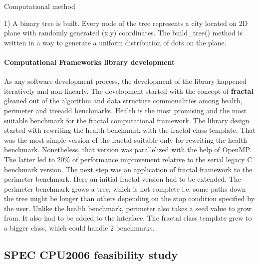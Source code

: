 \documentclass[10pt,a4paper]{report}
\begin{document}
Computational method

1) A binary tree is built. Every node of the tree represents a city located on 2D plane with randomly generated (x,y) coordinates. The build\_tree() method is written in a way to generate a uniform distribution of dots on the plane.


\paragraph{Computational Frameworks library development}
\quad As any software development process, the development of the library happened iteratively and non-linearly. The development started with the concept of \textbf{fractal} gleaned out of the algorithm and data structure commonalities among health, perimeter and treeadd benchmarks. Health is the most promising and the most suitable benchmark for the fractal computational framework. The library design started with rewriting the health benchmark with the fractal class template. That was the most simple version of the fractal suitable only for rewriting the health benchmark. Nonetheless, that version was parallelized with the help of OpenMP. The latter led to 20\% of performance improvement relative to the serial legacy C benchmark version.\newline\null
\quad The next step was an application of fractal framework to the perimeter benchmark. Here an initial fractal version had to be extended. The perimeter benchmark grows a tree, which is not complete i.e. some paths down the tree might be longer than others depending on the stop condition specified by the user. Unlike the health benchmark, perimeter also takes a seed value to grow from. It also had to be added to the interface. The fractal class template grew to a bigger class, which could handle 2 benchmarks.    


\subsection{SPEC CPU2006 feasibility study}
\label{spec_cpu2006_feasibility}
\end{document}
